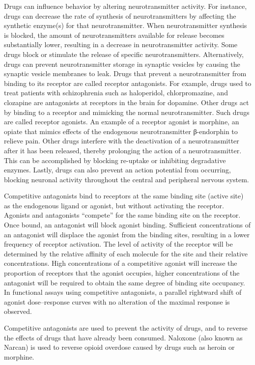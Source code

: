 \documentclass[]{book}
\begin{document}
Drugs can influence behavior by altering neurotransmitter activity. For instance, drugs can decrease the rate of synthesis of neurotransmitters by affecting the synthetic enzyme(s) for that neurotransmitter. When neurotransmitter synthesis is blocked, the amount of neurotransmitters available for release becomes substantially lower, resulting in a decrease in neurotransmitter activity. Some drugs block or stimulate the release of specific neurotransmitters. Alternatively, drugs can prevent neurotransmitter storage in synaptic vesicles by causing the synaptic vesicle membranes to leak. Drugs that prevent a neurotransmitter from binding to its receptor are called receptor antagonists. For example, drugs used to treat patients with schizophrenia such as haloperidol, chlorpromazine, and clozapine are antagonists at receptors in the brain for dopamine. Other drugs act by binding to a receptor and mimicking the normal neurotransmitter. Such drugs are called receptor agonists. An example of a receptor agonist is morphine, an opiate that mimics effects of the endogenous neurotransmitter β-endorphin to relieve pain. Other drugs interfere with the deactivation of a neurotransmitter after it has been released, thereby prolonging the action of a neurotransmitter. This can be accomplished by blocking re-uptake or inhibiting degradative enzymes. Lastly, drugs can also prevent an action potential from occurring, blocking neuronal activity throughout the central and peripheral nervous system.

Competitive antagonists bind to receptors at the same binding site (active site) as the endogenous ligand or agonist, but without activating the receptor. Agonists and antagonists ``compete'' for the same binding site on the receptor. Once bound, an antagonist will block agonist binding. Sufficient concentrations of an antagonist will displace the agonist from the binding sites, resulting in a lower frequency of receptor activation. The level of activity of the receptor will be determined by the relative affinity of each molecule for the site and their relative concentrations. High concentrations of a competitive agonist will increase the proportion of receptors that the agonist occupies, higher concentrations of the antagonist will be required to obtain the same degree of binding site occupancy. In functional assays using competitive antagonists, a parallel rightward shift of agonist dose--response curves with no alteration of the maximal response is observed.

Competitive antagonists are used to prevent the activity of drugs, and to reverse the effects of drugs that have already been consumed. Naloxone (also known as Narcan) is used to reverse opioid overdose caused by drugs such as heroin or morphine.
\end{document}
